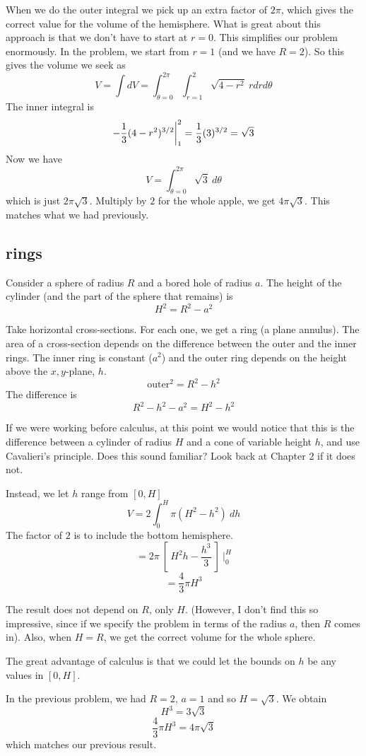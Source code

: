 \documentclass[11pt, oneside]{article}
\begin{document}
When we do the outer integral we pick up an extra factor of $2\pi$, which gives the correct value for the volume of the hemisphere.
What is great about this approach is that we don't have to start at $r=0$.  This simplifies our problem enormously.  In the problem, we start from $r=1$ (and we have $R=2$).  So this gives the volume we seek as
\[ V = \int dV = \int_{\theta=0}^{2 \pi} \int_{r=1}^2 \sqrt{4 - r^2}  \ r dr d \theta \]
The inner integral is
\[ -\frac{1}{3} (4 -r^2)^{3/2} \bigg{|}_1^2 = \frac{1}{3}(3)^{3/2} =  \sqrt{3} \]
Now we have
\[ V =  \int_{\theta=0}^{2 \pi} \sqrt{3} \ d \theta \]
which is just $2\pi \sqrt{3}$.  Multiply by $2$ for the whole apple, we get $4 \pi \sqrt{3}$.  This matches what we had previously.

\subsection*{rings}
Consider a sphere of radius $R$ and a bored hole of radius $a$.  The height of the cylinder (and the part of the sphere that remains) is 
\[ H^2 = R^2 - a^2 \]

Take horizontal cross-sections.  For each one, we get a ring (a plane annulus).  The area of a cross-section depends on the difference between the outer and the inner rings.  The inner ring is constant ($a^2$) and the outer ring depends on the height above the $x,y$-plane, $h$.
\[ \text{outer}^2 = R^2 - h^2 \]
The difference is
\[ R^2 - h^2 - a^2 = H^2 - h^2 \]

If we were working before calculus, at this point we would notice that this is the difference between a cylinder of radius $H$ and a cone of variable height $h$, and use Cavalieri's principle.  Does this sound familiar?  Look back at Chapter 2 if it does not.

Instead, we let $h$ range from $[0,H]$
\[ V = 2 \int_0^H \pi (H^2 - h^2) \ dh \]
The factor of $2$ is to include the bottom hemisphere.
\[ = 2 \pi \ [ \ H^2 h - \frac{h^3}{3} \ ] \ \bigg |_0^H \]
\[ = \frac{4}{3} \pi H^3 \]

The result does not depend on $R$, only $H$.  (However, I don't find this so impressive, since if we specify the problem in terms of the radius $a$, then $R$ comes in).  Also, when $H = R$, we get the correct volume for the whole sphere.

The great advantage of calculus is that we could let the bounds on $h$ be any values in $[0,H]$.

In the previous problem, we had $R = 2$, $a = 1$ and so $H = \sqrt{3}$.  We obtain
\[ H^3 = 3 \sqrt{3} \]
\[ \frac{4}{3} \pi H^3 = 4 \pi \sqrt{3}  \]
which matches our previous result.
\end{document}
